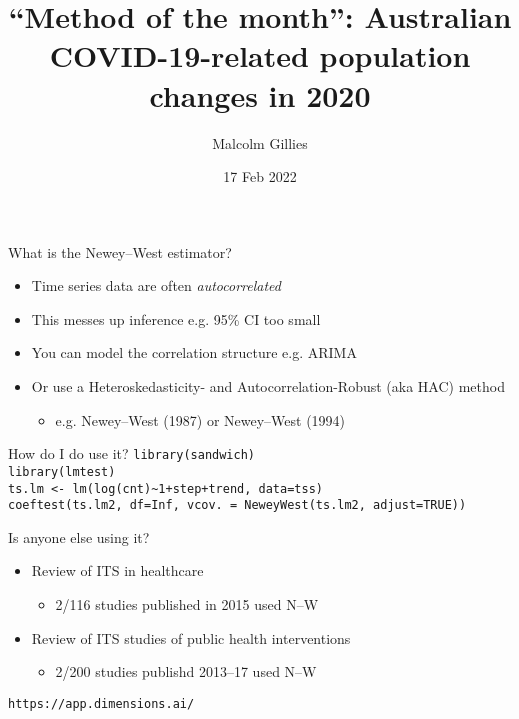 \documentclass[aspectratio=169,12pt]{beamer} %
\title{``Method of the month'': Australian COVID-19-related population changes in 2020}
\author{Malcolm Gillies}
\date{17 Feb 2022}
\begin{document}
{
\begin{frame}
\titlepage
\end{frame}
}

\begin{frame}{What is the Newey--West estimator?}
	\begin{itemize}
		\item Time series data are often \emph{autocorrelated}
		\item This messes up inference e.g. 95\% CI too small
		\item You can model the correlation structure e.g. ARIMA
		\item Or use a Heteroskedasticity- and Autocorrelation-Robust (aka HAC) method
		\begin{itemize}
			\item e.g. Newey--West (1987) or Newey--West (1994)
		\end{itemize}
	\end{itemize}
\end{frame}

\begin{frame}{How do I do use it?}
\texttt{library(sandwich)} \\
\texttt{library(lmtest)} \\
\medskip
\texttt{ts.lm <- lm(log(cnt)\textasciitilde 1+step+trend, data=tss)} \\
\texttt{coeftest(ts.lm2, df=Inf, vcov. = NeweyWest(ts.lm2, adjust=TRUE))}
\end{frame}

\begin{frame}{Is anyone else using it?}
	\begin{itemize}
		\item Review of ITS in healthcare
		\begin{itemize}
			\item 2/116 studies published in 2015 used N--W
		\end{itemize}
		\item Review of ITS studies of public health interventions
		\begin{itemize}
			\item 2/200 studies publishd 2013--17 used N--W
		\end{itemize}
	\end{itemize}
\end{frame}

\begin{frame}[plain,b]
\begin{flushright}\texttt{https://app.dimensions.ai/}\end{flushright}
\end{frame}
\usebackgroundtemplate{}
\end{document}

